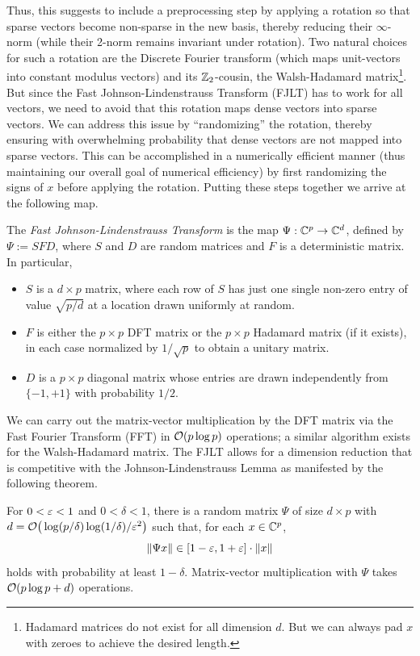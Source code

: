 Thus, this suggests to include a preprocessing step by applying a rotation so that sparse vectors become non-sparse in the new basis, thereby reducing their $\infty$-norm (while their 2-norm remains invariant under rotation). Two natural choices for such a rotation are  the Discrete Fourier transform (which maps unit-vectors into constant modulus vectors) and its $\mathbb{Z}_2$-cousin, the Walsh-Hadamard matrix\footnote{Hadamard matrices do not exist for all dimension $d$. But we can always pad $x$ with zeroes to achieve the desired length.}.
But since the Fast Johnson-Lindenstrauss Transform (FJLT) has to work for all vectors, we  need to avoid that this rotation maps dense vectors into sparse vectors. We can address this issue by ``randomizing'' the rotation, thereby ensuring with overwhelming probability that dense vectors are not mapped into sparse vectors. This can be accomplished in a numerically efficient manner (thus maintaining our overall goal of numerical efficiency) by first randomizing the signs of $x$ before applying the rotation. Putting these steps together we arrive at the following map.
\begin{definition}\label{FastJL}
The {\em Fast Johnson-Lindenstrauss Transform} is  the map $\Psi: \mathbb{C}^p \to \mathbb{C}^d$, defined by $\Psi:= S F D$, where 
$S$ and $D$ are random matrices and $F$ is a deterministic matrix. In particular,
\begin{itemize}
\setlength{\itemsep}{-0.5ex}
\setlength{\parsep}{-0.5ex}
\item $S$ is a $d \times p$ matrix, where each row of $S$ has just one single non-zero entry of value $\sqrt{p/d}$ at a location drawn uniformly at random.
\item $F$ is either the $p \times p$ DFT matrix or the $p \times p$ Hadamard matrix (if it exists), in each case normalized by $1/\sqrt{p}$ to obtain a unitary matrix.
\item $D$ is a $p\times p$ diagonal matrix whose entries are drawn independently  from $\{-1,+1\}$ with probability $1/2$.
\end{itemize}
\end{definition}

We can carry out the matrix-vector multiplication by the DFT matrix via the Fast Fourier Transform (FFT) in $\mathcal{O}(p \log p)$ operations; a similar algorithm exists for the Walsh-Hadamard matrix.
The FJLT allows for a dimension reduction that is competitive with the Johnson-Lindenstrauss Lemma as manifested by the following theorem.

\begin{theorem}\label{th:fjl}
For $0<\varepsilon<1$ and $0<\delta<1$, there is a random matrix $\Psi$ of size $d \times p$ with $d = \mathcal{O} \big( \log(p/\delta) \log(1/\delta) /\varepsilon^2\big)$ such that, for
each $x \in \mathbb{C}^p$,
$$\| \Psi x \| \in [1-\varepsilon,1+\varepsilon] \cdot \|x\|$$
holds with probability at least $1-\delta$. Matrix-vector multiplication with $\Psi$ takes $\mathcal{O}(p\log p +d)$ operations.
\end{theorem}

